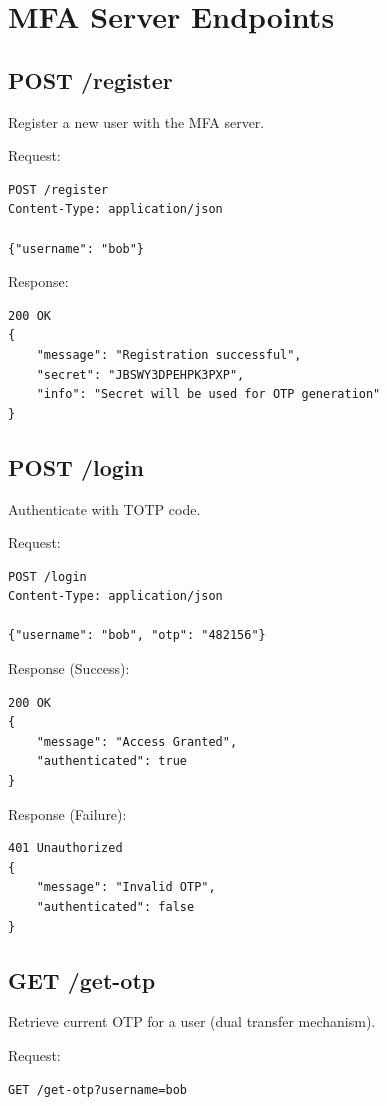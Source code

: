\documentclass[12pt,a4paper]{report}
\begin{document}
\section{MFA Server Endpoints}

\subsection{POST /register}

Register a new user with the MFA server.

Request:
\begin{lstlisting}
POST /register
Content-Type: application/json

{"username": "bob"}
\end{lstlisting}

Response:
\begin{lstlisting}
200 OK
{
    "message": "Registration successful",
    "secret": "JBSWY3DPEHPK3PXP",
    "info": "Secret will be used for OTP generation"
}
\end{lstlisting}

\subsection{POST /login}

Authenticate with TOTP code.

Request:
\begin{lstlisting}
POST /login
Content-Type: application/json

{"username": "bob", "otp": "482156"}
\end{lstlisting}

Response (Success):
\begin{lstlisting}
200 OK
{
    "message": "Access Granted",
    "authenticated": true
}
\end{lstlisting}

Response (Failure):
\begin{lstlisting}
401 Unauthorized
{
    "message": "Invalid OTP",
    "authenticated": false
}
\end{lstlisting}

\subsection{GET /get-otp}

Retrieve current OTP for a user (dual transfer mechanism).

Request:
\begin{lstlisting}
GET /get-otp?username=bob
\end{lstlisting}
\end{document}
